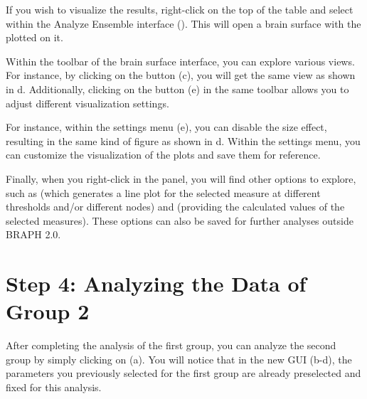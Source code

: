 \documentclass[justified]{tufte-handout}
\begin{document}
If you wish to visualize the results, right-click on the top of the table and select  within the Analyze Ensemble interface (). This will open a brain surface with the  plotted on it.

Within the toolbar of the brain surface interface, you can explore various views.
For instance, by clicking on the  button (c), you will get the same view as shown in d. Additionally, clicking on the  button (e) in the same toolbar allows you to adjust different visualization settings.

For instance, within the settings menu (e), you can disable the size effect, resulting in the same kind of figure as shown in d. Within the settings menu, you can customize the visualization of the plots and save them for reference.

Finally, when you right-click in the  panel, you will find other options to explore, such as  (which generates a line plot for the selected measure at different thresholds and/or different nodes) and  (providing the calculated values of the selected measures). These options can also be saved for further analyses outside BRAPH 2.0.

\section{Step 4: Analyzing the Data of Group 2}

After completing the analysis of the first group, you can analyze the second group by simply clicking on  (a). You will notice that in the new GUI (b-d), the parameters you previously selected for the first group are already preselected and fixed for this analysis. 
\end{document}
